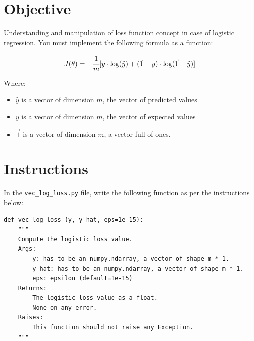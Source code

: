 \documentclass{42-en}
\begin{document}
\section*{Objective}
Understanding and manipulation of loss function concept in case of logistic regression.
You must implement the following formula as a function:  

$$
J( \theta) = -\cfrac{1} {m} \lbrack y \cdot \log(\hat{y}) + (\vec{1} - y) \cdot \log(\vec{1} - \hat{y})\rbrack
$$

Where:
\begin{itemize}
  \item $\hat{y}$ is a vector of dimension $m$, the vector of predicted values
  \item $y$ is a vector of dimension $m$, the vector of expected values
  \item $\vec{1}$ is a vector of dimension $m$, a vector full of ones.
\end{itemize}


\section*{Instructions}
In the \texttt{vec\_log\_loss.py} file, write the following function as per the instructions below:

\begin{verbatim}
def vec_log_loss_(y, y_hat, eps=1e-15):
    """
    Compute the logistic loss value.
    Args:
        y: has to be an numpy.ndarray, a vector of shape m * 1.
        y_hat: has to be an numpy.ndarray, a vector of shape m * 1.
        eps: epsilon (default=1e-15)
    Returns:
        The logistic loss value as a float.
        None on any error.
    Raises:
        This function should not raise any Exception.
    """
\end{verbatim}


\end{document}
